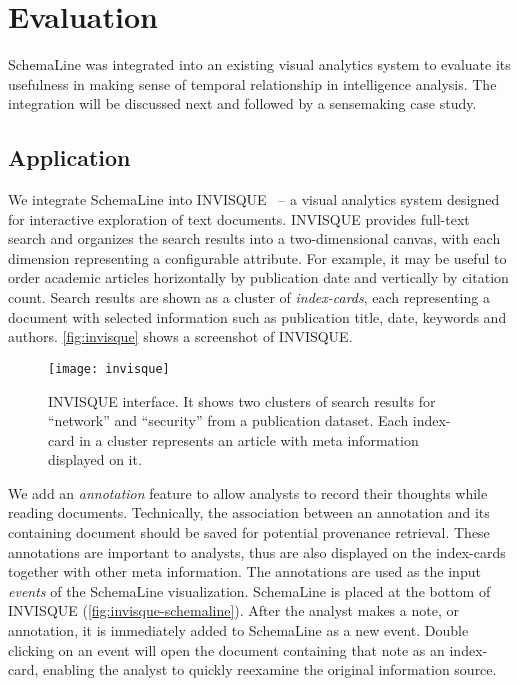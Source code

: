 \section{Evaluation}
\label{sub:sl-evaluation}
SchemaLine was integrated into an existing visual analytics system to evaluate its usefulness in making sense of temporal relationship in intelligence analysis. The integration will be discussed next and followed by a sensemaking case study.

\subsection{Application}
We integrate SchemaLine into INVISQUE~\cite{Wong2011} -- a visual analytics system designed for interactive exploration of text documents. INVISQUE provides full-text search and organizes the search results into a two-dimensional canvas, with each dimension representing a configurable attribute. For example, it may be useful to order academic articles horizontally by publication date and vertically by citation count. Search results are shown as a cluster of \emph{index-cards}, each representing a document with selected information such as publication title, date, keywords and authors. \autoref{fig:invisque} shows a screenshot of INVISQUE.

\begin{figure}[!htb]
	\centering
	\texttt{[image: invisque]}
	\caption[INVISQUE interface]{INVISQUE interface. It shows two clusters of search results for ``network'' and ``security'' from a publication dataset. Each index-card in a cluster represents an article with meta information displayed on it. }
	\label{fig:invisque}
\end{figure}

We add an \emph{annotation} feature to allow analysts to record their thoughts while reading documents. Technically, the association between an annotation and its containing document should be saved for potential provenance retrieval. These annotations are important to analysts, thus are also displayed on the index-cards together with other meta information. The annotations are used  as the input \emph{events} of the SchemaLine visualization. SchemaLine is placed at the bottom of INVISQUE (\autoref{fig:invisque-schemaline}). After the analyst makes a note, or annotation, it is immediately added to SchemaLine as a new event. Double clicking on an event will open the document containing that note as an index-card, enabling the analyst to quickly reexamine the original information source.

